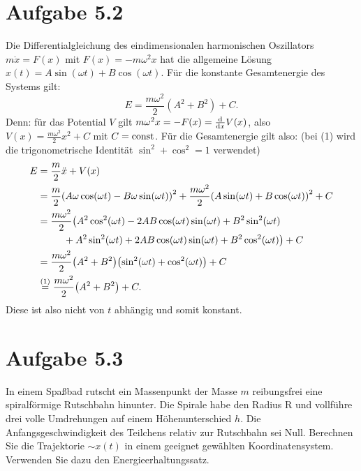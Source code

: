 \documentclass{theozettel}
\begin{document}
\section*{Aufgabe 5.2}
Die Differentialgleichung des eindimensionalen harmonischen Oszillators $m\ddot{x} = F(x)$ mit $F(x) = -m\omega^{2}x$ hat die allgemeine Lösung $x(t) = A\sin(\omega t) + B\cos(\omega t)$. Für die konstante Gesamtenergie des Systems gilt:
	\[
		E = \frac{m\omega^{2}}{2}(A^{2}+B^{2}) + C.
	\]
Denn: für das Potential $V$ gilt $m\omega^{2}x = -F(x) = \dv{x} V(x)$, also $V(x) = \frac{m\omega^{2}}{2}x^{2}+C$ mit $C = \operatorname{const}$. Für die Gesamtenergie gilt also: (bei (1) wird die trigonometrische Identität $\sin^{2} + \cos^{2} = 1$ verwendet)
	\begin{align*}
		E &= \frac{m}{2}\ddot{x} + V(x) \\
		&= \frac{m}{2}\qty(A\omega\cos(\omega t) - B\omega\sin(\omega t))^{2} + \frac{m\omega^{2}}{2}\qty(A\sin(\omega t) + B\cos(\omega t))^{2} + C \\
		&= \frac{m\omega^{2}}{2}\big(A^{2}\cos^{2}(\omega t) - 2AB\cos(\omega t)\sin(\omega t) + B^{2}\sin^{2}(\omega t) \\ & \ \ \ \ \ \ \ \ + A^{2}\sin^{2}(\omega t) + 2AB\cos(\omega t)\sin(\omega t) + B^{2}\cos^{2}(\omega t)\big) + C\\
		&= \frac{m\omega^{2}}{2}\qty(A^{2}+B^{2})\qty(\sin^{2}(\omega t) + \cos^{2}(\omega t)) + C\\
		&\stackrel{(1)}{=} \frac{m\omega^{2}}{2}\qty(A^{2}+B^{2}) + C.
	\end{align*}
Diese ist also nicht von $t$ abhängig und somit konstant. 


\newpage
\section*{Aufgabe 5.3}
In einem Spaßbad rutscht ein Massenpunkt der Masse $m$ reibungsfrei eine spiralförmige Rutschbahn hinunter. Die Spirale habe den Radius R und vollführe drei volle Umdrehungen auf einem
Höhenunterschied $h$. Die Anfangsgeschwindigkeit des Teilchens relativ zur Rutschbahn sei Null.
Berechnen Sie die Trajektorie $\sim x(t)$ in einem geeignet gewählten Koordinatensystem. Verwenden
Sie dazu den Energieerhaltungssatz.
\end{document}
